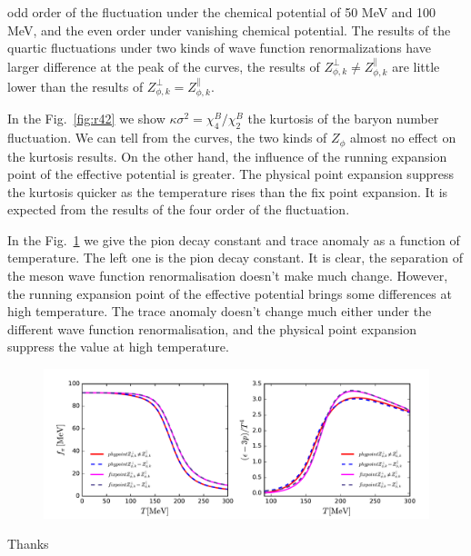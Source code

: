 \documentclass[%
reprint,
superscriptaddress,
showpacs,preprintnumbers,
 amsmath,amssymb,
 aps,
prd,
]{revtex4-1}
\def\Fig#1{Fig.~\ref{#1}} \def\Tab#1{Tab.~\ref{#1}}
\begin{document}
odd order of the fluctuation under the chemical potential of 50 MeV and 100 MeV, and the even order under vanishing chemical potential. 
The results of the quartic fluctuations under two kinds of wave function renormalizations have larger difference at the peak of the curves, 
the results of $Z^{\bot}_{\phi,k}\neq Z^{\|}_{\phi,k} $ are little lower than the results of $Z^{\bot}_{\phi,k}= Z^{\|}_{\phi,k} $.\par
In the \Fig{fig:r42} we show $\kappa \sigma^2=\chi^{B}_{4}/\chi^{B}_{2}$ the kurtosis of the baryon number fluctuation. We can tell from the curves, the two kinds of 
$Z_\phi$ almost no effect on the kurtosis results. On the other hand, the influence of the running expansion point of the effective potential is greater. The physical point expansion 
suppress the kurtosis quicker as the temperature rises than the fix point expansion. It is expected from the results of the four order of the fluctuation.\par
In the \Fig{fig:fpitra} we give the pion decay constant and trace anomaly as a function of temperature. The left one is the pion decay constant. It is clear, the separation of 
the meson wave function renormalisation doesn't make much change. However, the running expansion point of the effective potential brings some differences at high 
temperature. The trace anomaly doesn't change much either under the different wave function renormalisation, and the physical point expansion suppress the value at high
temperature.



\begin{figure}[t]
\label{fig:fpitra}
\includegraphics[width=1.0\textwidth]{fpitra.pdf}
\caption{}
\end{figure}




\acknowledgments
Thanks


\end{document}
